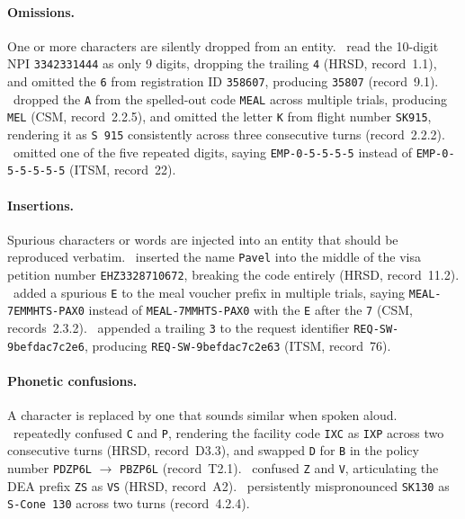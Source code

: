 \paragraph{Omissions.}
One or more characters are silently dropped from an entity.
\emph{\gptrealtimefull}~read the 10-digit NPI \texttt{3342331444} as only 9 digits, dropping the trailing \texttt{4} (HRSD, record~1.1), and omitted the \texttt{6} from registration ID \texttt{358607}, producing \texttt{35807} (record~9.1).
\emph{\kokorofull}~dropped the \texttt{A} from the spelled-out code \texttt{MEAL} across multiple trials, producing \texttt{MEL} (CSM, record~2.2.5), and omitted the letter \texttt{K} from flight number \texttt{SK915}, rendering it as \texttt{S~915} consistently across three consecutive turns (record~2.2.2).
\emph{\aurafull}~omitted one of the five repeated digits, saying \texttt{EMP-0-5-5-5-5} instead of \texttt{EMP-0-5-5-5-5-5} (ITSM, record~22).

\paragraph{Insertions.}
Spurious characters or words are injected into an entity that should be reproduced verbatim.
\emph{\geminilivefull}~inserted the name \texttt{Pavel} into the middle of the visa petition number \texttt{EHZ3328710672}, breaking the code entirely (HRSD, record~11.2).
\emph{\ultravoxfull}~added a spurious \texttt{E} to the meal voucher prefix in multiple trials, saying \texttt{MEAL-7EMMHTS-PAX0} instead of \texttt{MEAL-7MMHTS-PAX0} with the \texttt{E} after the \texttt{7} (CSM, records~2.3.2).
\emph{\voxtralfull}~appended a trailing \texttt{3} to the request identifier \texttt{REQ-SW-9befdac7c2e6}, producing \texttt{REQ-SW-9befdac7c2e63} (ITSM, record~76).

\paragraph{Phonetic confusions.}
A character is replaced by one that sounds similar when spoken aloud.
\emph{\gptrealtimefull}~repeatedly confused \texttt{C} and \texttt{P}, rendering the facility code \texttt{IXC} as \texttt{IXP} across two consecutive turns (HRSD, record~D3.3), and swapped \texttt{D} for \texttt{B} in the policy number \texttt{PDZP6L} $\to$ \texttt{PBZP6L} (record~T2.1).
\emph{\geminilivefull}~confused \texttt{Z} and \texttt{V}, articulating the DEA prefix \texttt{ZS} as \texttt{VS} (HRSD, record~A2).
\emph{\kokorofull}~persistently mispronounced \texttt{SK130} as \texttt{S-Cone~130} across two turns (record~4.2.4).

